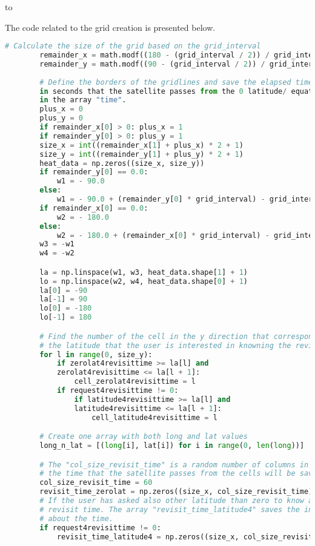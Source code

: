 \documentclass[12pt,a4paper,notitlepage,oneside,openright]{report}
\begin{document}
\def\dashfill{\cleaders\hbox{-}\hfill}
\hbox to \hsize{\dashfill\hfil}

The code related to the grid creation is presented below.
\begin{center}
\begin{lstlisting}[language=Python, formfeed=\newpage, extendedchars=true] 
		# Calculate the size of the grid based on the grid_interval
        remainder_x = math.modf((180 - (grid_interval / 2)) / grid_interval)
        remainder_y = math.modf((90 - (grid_interval / 2)) / grid_interval)
        
        # Define the borders of the gridlines and save the elapsed time
        in seconds that the satellite passes from the 0 latitude/ equator
        in the array "time".
        plus_x = 0
        plus_y = 0
        if remainder_x[0] > 0: plus_x = 1
        if remainder_y[0] > 0: plus_y = 1
        size_x = int((remainder_x[1] + plus_x) * 2 + 1)
        size_y = int((remainder_y[1] + plus_y) * 2 + 1)
        heat_data = np.zeros((size_x, size_y))
        if remainder_y[0] == 0.0:
            w1 = - 90.0
        else:
            w1 = - 90.0 + (remainder_y[0] * grid_interval) - grid_interval
        if remainder_x[0] == 0.0:
            w2 = - 180.0
        else:
            w2 = - 180.0 + (remainder_x[0] * grid_interval) - grid_interval
        w3 = -w1
        w4 = -w2

        la = np.linspace(w1, w3, heat_data.shape[1] + 1)
        lo = np.linspace(w2, w4, heat_data.shape[0] + 1)
        la[0] = -90
        la[-1] = 90
        lo[0] = -180
        lo[-1] = 180

        # Find the number of the cell in the y direction that corresponds to
        # the latitude that the user is interested in knowning the revisit time.
        for l in range(0, size_y):
            if zerolat4revisittime >= la[l] and
            zerolat4revisittime <= la[l + 1]:
                cell_zerolat4revisittime = l
            if request4revisittime != 0:
                if latitude4revisittime >= la[l] and
                latitude4revisittime <= la[l + 1]:
                    cell_latitude4revisittime = l

        # Create one array with both long and lat values
        long_n_lat = [(long[i], lat[i]) for i in range(0, len(long))]

        # The "col_size_revisit_time" is a random number of columns in which
        # the time that the satellite passes from the cells will be saved.
        col_size_revisit_time = 60
        revisit_time_zerolat = np.zeros((size_x, col_size_revisit_time))
		# If the user has asked also other latitude than zero to know about the
		# revisit time. The array "revisit_time_latitude4" saves the info
		# about the time.        
        if request4revisittime != 0:
            revisit_time_latitude4 = np.zeros((size_x, col_size_revisit_time))

\end{lstlisting}
\end{center}
\end{document}
